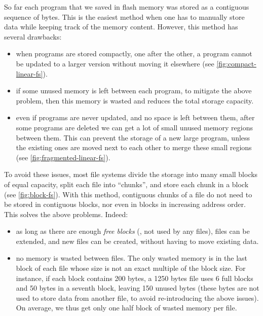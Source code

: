 So far each program that we saved in flash memory was stored as a contiguous
sequence of bytes. This is the easiest method when one has to manually store
data while keeping track of the memory content. However, this method has
several drawbacks:
\begin{itemize}
  \item when programs are stored compactly, one after the other, a program
  cannot be updated to a larger version without moving it elsewhere (see
  \cref{fig:compact-linear-fs}).

  \item if some unused memory is left between each program, to mitigate the
  above problem, then this memory is wasted and reduces the total storage
  capacity.

  \item even if programs are never updated, and no space is left between them,
  after some programs are deleted we can get a lot of small unused memory
  regions between them. This can prevent the storage of a new large program,
  unless the existing ones are moved next to each other to merge these small
  regions (see \cref{fig:fragmented-linear-fs}).
\end{itemize}

To avoid these issues, most file systems divide the storage into many small
blocks of equal capacity, split each file into ``chunks'', and store each chunk
in a block (see \cref{fig:block-fs}). With this method, contiguous chunks of a
file do not need to be stored in contiguous blocks, nor even in blocks in
increasing address order. This solves the above problems. Indeed:
\begin{itemize}
  \item as long as there are enough {\em free blocks} (\ie, not used by any
  files), files can be extended, and new files can be created, without having
  to move existing data.

  \item no memory is wasted between files. The only wasted memory is in the
  last block of each file whose size is not an exact multiple of the block
  size. For instance, if each block contains 200 bytes, a 1250 bytes file uses 6
  full blocks and 50 bytes in a seventh block, leaving 150 unused bytes (these
  bytes are not used to store data from another file, to avoid re-introducing
  the above issues). On average, we thus get only one half block of wasted
  memory per file.
\end{itemize}

